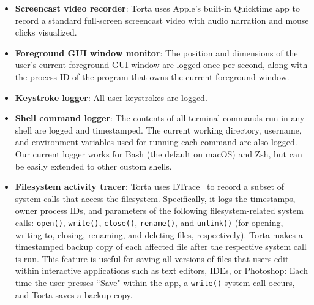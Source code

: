 \begin{itemize}\itemsep0pt

\item \textbf{Screencast video recorder}: Torta uses Apple's built-in
Quicktime app to record a standard full-screen screencast video with
audio narration and mouse clicks visualized.

\item \textbf{Foreground GUI window monitor}: The position and
dimensions of the user's current foreground GUI window are logged once
per second, along with the process ID of the program that owns the
current foreground window.

\item \textbf{Keystroke logger}: All user keystrokes are logged.


\item \textbf{Shell command logger}: The contents of all terminal
commands run in any shell are logged and timestamped. The current
working directory, username, and environment variables used for running
each command are also logged. Our current logger works for Bash (the
default on macOS) and Zsh, but can be easily extended to other custom
shells.

\item \textbf{Filesystem activity tracer}: Torta uses DTrace~\cite{Cantrill2004} to record
a subset of system calls that access the filesystem. Specifically, it
logs the timestamps, owner process IDs, and parameters of the following
filesystem-related system calls: {\small \texttt{open()}}, {\small
\texttt{write()}}, {\small \texttt{close()}}, {\small
\texttt{rename()}}, and {\small \texttt{unlink()}} (for opening, writing
to, closing, renaming, and deleting files, respectively).
Torta makes a timestamped backup copy of each affected file after the
respective system call is run. This feature is useful for saving all versions of
files that users edit within interactive applications such as text
editors, IDEs, or Photoshop: Each time the user presses ``Save" within the app, a
{\small \texttt{write()}} system call occurs, and Torta saves a backup
copy.


\end{itemize}
